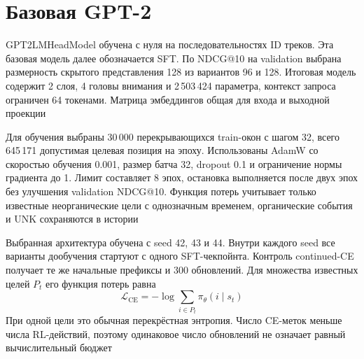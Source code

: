 \FloatBarrier
\section{Базовая GPT-2}

GPT2LMHeadModel обучена с нуля на последовательностях ID треков.
Эта базовая модель далее обозначается SFT.
По NDCG@10 на validation выбрана размерность скрытого представления 128
из вариантов 96 и 128. Итоговая модель содержит 2 слоя,
4 головы внимания и 2\,503\,424 параметра, контекст запроса ограничен
64 токенами. Матрица эмбеддингов общая для входа и выходной проекции

Для обучения выбраны 30\,000 перекрывающихся train-окон с шагом 32,
всего 645\,171 допустимая целевая позиция на эпоху.
Использованы AdamW со скоростью обучения 0.001, размер батча 32,
dropout 0.1 и ограничение нормы градиента до 1.
Лимит составляет 8 эпох, остановка выполняется после двух эпох
без улучшения validation NDCG@10. Функция потерь учитывает только
известные неорганические цели с однозначным временем,
органические события и UNK сохраняются в истории

Выбранная архитектура обучена с seed 42, 43 и 44.
Внутри каждого seed все варианты дообучения стартуют с одного SFT-чекпойнта.
Контроль continued-CE получает те же начальные префиксы и 300 обновлений.
Для множества известных целей \(P_t\) его функция потерь равна
\[
  \mathcal L_{\mathrm{CE}}=-\log\sum_{i\in P_t}\pi_\theta(i\mid s_t)
\]
При одной цели это обычная перекрёстная энтропия.
Число CE-меток меньше числа RL-действий, поэтому одинаковое число
обновлений не означает равный вычислительный бюджет
